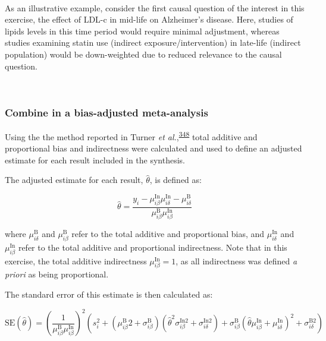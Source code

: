 \documentclass[a4paper, twoside]{templates/ociamthesis}
\begin{document}
~

As an illustrative example, consider the first causal question of the interest in this exercise, the effect of LDL-c in mid-life on Alzheimer's disease. Here, studies of lipids levels in this time period would require minimal adjustment, whereas studies examining statin use (indirect exposure/intervention) in late-life (indirect population) would be down-weighted due to reduced relevance to the causal question.

~

\hypertarget{combine-in-a-bias-adjusted-meta-analysis}{%
\subsubsection{Combine in a bias-adjusted meta-analysis}\label{combine-in-a-bias-adjusted-meta-analysis}}

Using the the method reported in Turner \emph{et al.},\textsuperscript{\protect\hyperlink{ref-turner2009}{348}} total additive and proportional bias and indirectness were calculated and used to define an adjusted estimate for each result included in the synthesis.

The adjusted estimate for each result, \(\hat\theta\), is defined as:

\begin{equation}
  \hat{\theta} = \frac{y_i - \mu_{i\beta}^{\mathrm{In}}\mu_{i\delta}^{\mathrm{In}} - \mu_{i\delta}^{\mathrm{B}}}{\mu_{i\beta}^{\mathrm{B}}\mu_{i\beta}^{\mathrm{In}}}
  \label{eq:adjusted-mean}
\end{equation}

where \(\mu_{i\delta}^{\mathrm{B}}\) and \(\mu_{i\beta}^{\mathrm{B}}\) refer to the total additive and proportional bias, and \(\mu_{i\delta}^{\mathrm{In}}\) and \(\mu_{i\beta}^{\mathrm{In}}\) refer to the total additive and proportional indirectness. Note that in this exercise, the total additive indirectness \(\mu_{i\beta}^{\mathrm{In}} = 1\), as all indirectness was defined \emph{a priori} as being proportional.

The standard error of this estimate is then calculated as:

\begin{equation}
  \mathrm{SE}(\hat{\theta})=\left(\frac{1}{\mu_{i \beta}^{\mathrm{B}} \mu_{i \beta}^{\mathrm{In}}}\right)^{2}\left(s_{i}^{2}+\left(\mu_{i \beta}^{\mathrm{B}} 2+\sigma_{i \beta}^{\mathrm{B}}\right)\left(\hat{\theta}^{2} \sigma_{i \beta}^{\mathrm{In} 2}+\sigma_{i \delta}^{\mathrm{In} 2}\right)+\sigma_{i \beta}^{\mathrm{B}}\left(\hat{\theta} \mu_{i \beta}^{\mathrm{In}}+\mu_{i \delta}^{\mathrm{In}}\right)^{2}+\sigma_{i \delta}^{\mathrm{B} 2}\right)
  \label{eq:adjusted-se}
\end{equation}
\end{document}
